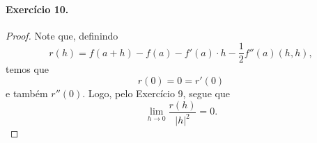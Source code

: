 \documentclass[12pt,a4paper]{article}
\begin{document}
\paragraph{Exercício 10.}
    \begin{proof}
        Note que, definindo
        \begin{equation*}
            r(h) = f(a+h) - f(a) - f'(a)\cdot h - \frac{1}{2}f''(a)(h,h),
        \end{equation*}
        temos que
        \begin{equation*}
            r(0) = 0 = r'(0)
        \end{equation*}
        e também $r''(0)$. Logo, pelo Exercício 9, segue que
        \begin{equation*}
            \lim_{h\to 0} \frac{r(h)}{|h|^2} = 0.
        \end{equation*}
    \end{proof}
\end{document}
